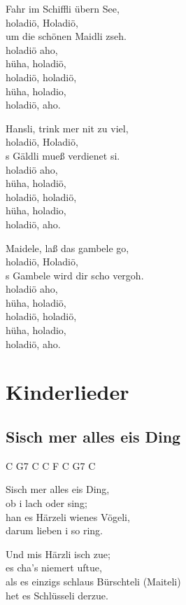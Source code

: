 \documentclass[
  letterpaper,
]{scrbook}
\begin{document}
Fahr im Schiffli übern See,\\
holadiö, Holadiö,\\
um die schönen Maidli zseh.\\
holadiö aho,\\
hüha, holadiö,\\
holadiö, holadiö,\\
hüha, holadio,\\
holadiö, aho.

Hansli, trink mer nit zu viel,\\
holadiö, Holadiö,\\
\textquotesingle s Gäldli mueß verdienet si.\\
holadiö aho,\\
hüha, holadiö,\\
holadiö, holadiö,\\
hüha, holadio,\\
holadiö, aho.

Maidele, laß das gambele go,\\
holadiö, Holadiö,\\
\textquotesingle s Gambele wird dir scho vergoh.\\
holadiö aho,\\
hüha, holadiö,\\
holadiö, holadiö,\\
hüha, holadio,\\
holadiö, aho.

\part{Kinderlieder}

\hypertarget{sisch-mer-alles-eis-ding}{%
\chapter{S\textquotesingle isch mer alles eis
Ding}\label{sisch-mer-alles-eis-ding}}

C G7 C C F C G7 C

S\textquotesingle isch mer alles eis Ding,\\
ob i lach oder sing;\\
han es Härzeli wienes Vögeli,\\
darum lieben i so ring.

Und mis Härzli isch zue;\\
es cha's niemert uftue,\\
als es einzigs schlaus Bürschteli (Maiteli)\\
het es Schlüsseli derzue.
\end{document}

